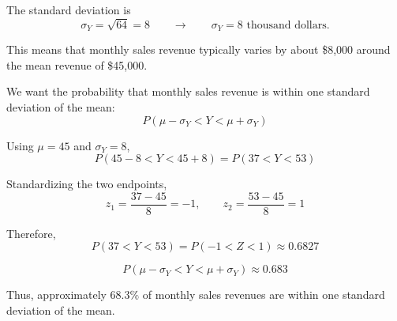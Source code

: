 
The standard deviation is
\[
\sigma_Y=\sqrt{64}=8
\qquad \longrightarrow \qquad
\boxed{\sigma_Y=8\text{ thousand dollars}}.
\]

This means that monthly sales revenue typically varies by about
\$8,000 around the mean revenue of \$45,000.


We want the probability that monthly sales revenue is within one standard
deviation of the mean:
\[
P(\mu-\sigma_Y<Y<\mu+\sigma_Y)
\]

Using $\mu=45$ and $\sigma_Y=8$,
\[
P(45-8<Y<45+8)
=
P(37<Y<53)
\]

Standardizing the two endpoints,
\[
z_1=\frac{37-45}{8}=-1,
\qquad
z_2=\frac{53-45}{8}=1
\]

Therefore,
\[
P(37<Y<53)
=
P(-1<Z<1)
\approx0.6827
\]

\[
\boxed{P(\mu-\sigma_Y<Y<\mu+\sigma_Y)\approx0.683}
\]

Thus, approximately $68.3\%$ of monthly sales revenues are within one
standard deviation of the mean.





